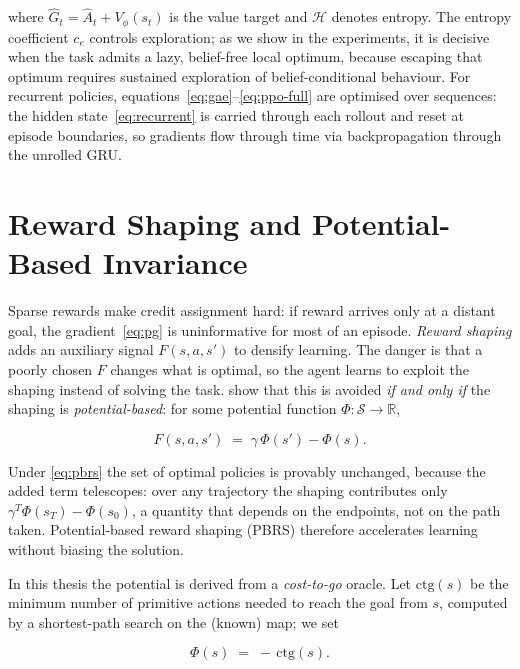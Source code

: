 where $\hat{G}_t = \hat{A}_t + V_\phi(s_t)$ is the value target and
$\mathcal{H}$ denotes entropy. The entropy coefficient $c_e$ controls
exploration; as we show in the experiments, it is decisive when the task admits
a lazy, belief-free local optimum, because escaping that optimum requires
sustained exploration of belief-conditional behaviour. For recurrent policies,
equations~\eqref{eq:gae}--\eqref{eq:ppo-full} are optimised over sequences: the
hidden state~\eqref{eq:recurrent} is carried through each rollout and reset at
episode boundaries, so gradients flow through time via backpropagation through
the unrolled GRU.

\section{Reward Shaping and Potential-Based Invariance}
\label{sec:bg-shaping}

Sparse rewards make credit assignment hard: if reward arrives only at a distant
goal, the gradient~\eqref{eq:pg} is uninformative for most of an episode.
\emph{Reward shaping} adds an auxiliary signal $F(s,a,s')$ to densify learning.
The danger is that a poorly chosen $F$ changes what is optimal, so the agent
learns to exploit the shaping instead of solving the task. \citet{ng1999policy}
show that this is avoided \emph{if and only if} the shaping is
\emph{potential-based}: for some potential function $\Phi : \mathcal{S} \to
\mathbb{R}$,

\begin{equation}
    F(s,a,s') \;=\; \gamma\, \Phi(s') - \Phi(s).
    \label{eq:pbrs}
\end{equation}

Under \eqref{eq:pbrs} the set of optimal policies is provably unchanged, because
the added term telescopes: over any trajectory the shaping contributes only
$\gamma^{T}\Phi(s_T) - \Phi(s_0)$, a quantity that depends on the endpoints, not
on the path taken. Potential-based reward shaping (PBRS) therefore accelerates
learning without biasing the solution.

In this thesis the potential is derived from a \emph{cost-to-go} oracle. Let
$\mathrm{ctg}(s)$ be the minimum number of primitive actions needed to reach the
goal from $s$, computed by a shortest-path search on the (known) map; we set

\begin{equation}
    \Phi(s) \;=\; -\,\mathrm{ctg}(s).
    \label{eq:phi-ctg}
\end{equation}

